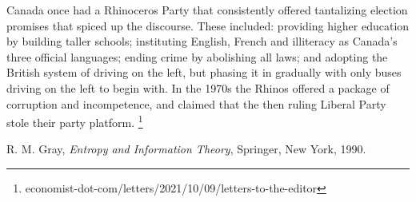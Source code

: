 \documentclass[11pt]{article} %
\begin{document}
Canada once had a Rhinoceros Party that consistently offered tantalizing election promises that spiced up the discourse. These included: providing higher education by building taller schools; instituting English, French and illiteracy as Canada's three official languages; ending crime by abolishing all laws; and adopting the British system of driving on the left, but phasing it in gradually with only buses driving on the left to begin with. In the 1970s the Rhinos offered a package of corruption and incompetence, and claimed that the then ruling Liberal Party stole their party platform.%
\footnote{economist-dot-com/letters/2021/10/09/letters-to-the-editor}

%
\begin{thebibliography}{9}

R. M. Gray,
\textit{Entropy and Information Theory},
Springer, New York, 1990.

\end{thebibliography}
\end{document}
